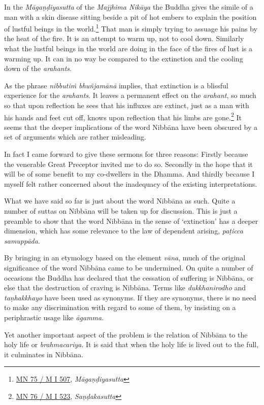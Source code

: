 In the \emph{Māgaṇḍiyasutta} of the \emph{Majjhima Nikāya} the Buddha gives the simile of a man with a skin disease sitting beside a pit of hot embers to explain the position of lustful beings in the world.\footnote{\href{https://suttacentral.net/mn75/pli/ms}{MN 75 / M I 507}, \emph{Māgaṇḍiyasutta}} That man is simply trying to assuage his pains by the heat of the fire. It is an attempt to warm up, not to cool down. Similarly what the lustful beings in the world are doing in the face of the fires of lust is a warming up. It can in no way be compared to the extinction and the cooling down of the \emph{arahants}.

As the phrase \emph{nibbutiṁ bhuñjamānā} implies, that extinction is a blissful experience for the \emph{arahants}. It leaves a permanent effect on the \emph{arahant}, so much so that upon reflection he sees that his influxes are extinct, just as a man with his hands and feet cut off, knows upon reflection that his limbs are gone.\footnote{\href{https://suttacentral.net/mn76/pli/ms}{MN 76 / M I 523}, \emph{Saṇḍakasutta}} It seems that the deeper implications of the word Nibbāna have been obscured by a set of arguments which are rather misleading.

In fact I came forward to give these sermons for three reasons: Firstly because the venerable Great Preceptor invited me to do so. Secondly in the hope that it will be of some benefit to my co-dwellers in the Dhamma. And thirdly because I myself felt rather concerned about the inadequacy of the existing interpretations.

What we have said so far is just about the word Nibbāna as such. Quite a number of suttas on Nibbāna will be taken up for discussion. This is just a preamble to show that the word Nibbāna in the sense of `extinction' has a deeper dimension, which has some relevance to the law of dependent arising, \emph{paṭicca samuppāda}.

By bringing in an etymology based on the element \emph{vāna}, much of the original significance of the word Nibbāna came to be undermined. On quite a number of occasions the Buddha has declared that the cessation of suffering is Nibbāna, or else that the destruction of craving is Nibbāna. Terms like \emph{dukkhanirodho} and \emph{taṇhakkhayo} have been used as synonyms. If they are synonyms, there is no need to make any discrimination with regard to some of them, by insisting on a periphrastic usage like \emph{āgamma}.

Yet another important aspect of the problem is the relation of Nibbāna to the holy life or \emph{brahmacariya}. It is said that when the holy life is lived out to the full, it culminates in Nibbāna.

